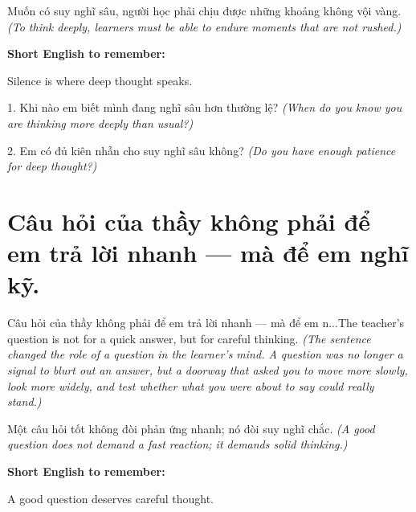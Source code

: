 \begin{baihoc}
Muốn có suy nghĩ sâu, người học phải chịu được những khoảng không vội vàng.
\textit{(To think deeply, learners must be able to endure moments that are not rushed.)}
\end{baihoc}

\begin{ghinhoanh}
\textbf{Short English to remember:}

Silence is where deep thought speaks.

\end{ghinhoanh}

\begin{tuhocnhanh}
1. Khi nào em biết mình đang nghĩ sâu hơn thường lệ? \textit{(When do you know you are thinking more deeply than usual?)}

2. Em có đủ kiên nhẫn cho suy nghĩ sâu không? \textit{(Do you have enough patience for deep thought?)}
\end{tuhocnhanh}
\ngancach


\section{Câu hỏi của thầy không phải để em trả lời nhanh — mà để em nghĩ kỹ.}
\begin{truyen}{Câu hỏi của thầy không phải để em trả lời nhanh — mà để em n...}{The teacher's question is not for a quick answer, but for careful thinking.}
\textit{(The sentence changed the role of a question in the learner's mind. A question was no longer a signal to blurt out an answer, but a doorway that asked you to move more slowly, look more widely, and test whether what you were about to say could really stand.)}
\end{truyen}

\begin{baihoc}
Một câu hỏi tốt không đòi phản ứng nhanh; nó đòi suy nghĩ chắc.
\textit{(A good question does not demand a fast reaction; it demands solid thinking.)}
\end{baihoc}

\begin{ghinhoanh}
\textbf{Short English to remember:}

A good question deserves careful thought.

\end{ghinhoanh}

